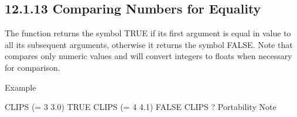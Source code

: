 \documentclass[letterpaper,10pt,english]{sphinxmanual}
\begin{document}

\begin{sphinxVerbatim}[commandchars=\\\{\}]
  
\end{sphinxVerbatim}


\begin{sphinxVerbatim}[commandchars=\\\{\}]
     

     
   
\end{sphinxVerbatim}


\subsection{12.1.13 Comparing Numbers for Equality}
\label{\detokenize{actions:comparing-numbers-for-equality}}
The \sphinxstylestrong{=} function returns the symbol TRUE if its first argument is
equal in value to all its subsequent arguments, otherwise it returns the
symbol FALSE. Note that \sphinxstylestrong{=} compares only numeric values and will
convert integers to floats when necessary for comparison.


\begin{sphinxVerbatim}[commandchars=\\\{\}]
  
\end{sphinxVerbatim}

Example

\begin{sphinxVerbatim}[commandchars=\\\{\}]
CLIPS\PYGZgt{} (= 3 3.0)
TRUE
CLIPS\PYGZgt{} (= 4 4.1)
FALSE
CLIPS\PYGZgt{}
? Portability Note
\end{sphinxVerbatim}
\end{document}
